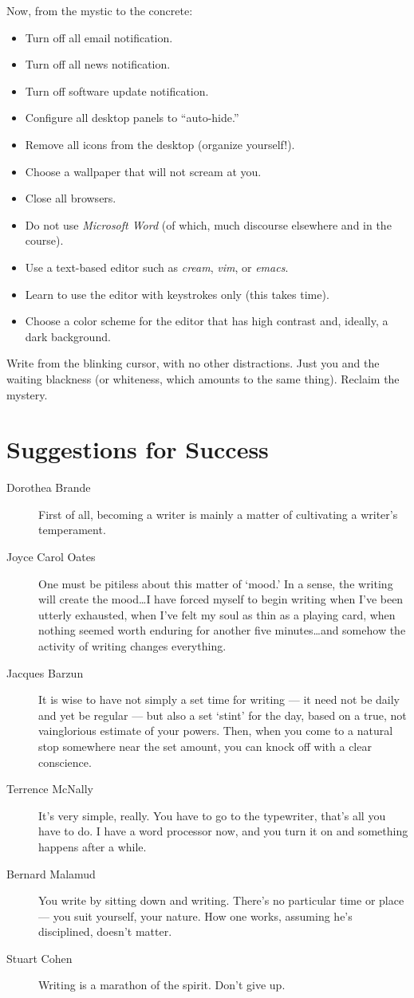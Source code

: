 \documentclass[letterpaper,oneside]{memoir}
\begin{document}
Now, from the mystic to the concrete:

\begin{itemize}
\item Turn off all email notification.
\item Turn off all news notification.
\item Turn off software update notification.
\item Configure all desktop panels to ``auto-hide.''
\item Remove all icons from the desktop (organize yourself!).
\item Choose a wallpaper that will not scream at you.
\item Close all browsers.
\item Do not use \textit{Microsoft Word} (of which, much discourse elsewhere and in the course).
\item Use a text-based editor such as \textit{cream}, \textit{vim}, or   \textit{emacs}.
\item Learn to use the editor with keystrokes only (this takes time).
\item Choose a color scheme for the editor that has high contrast and, ideally, a dark background.
\end{itemize}
Write from the blinking cursor, with no other distractions. Just you and the waiting blackness (or whiteness, which amounts to the same thing). Reclaim the mystery.
\newpage
\section{Suggestions for Success}
\begin{description}
\item [Dorothea Brande] First of all, becoming a writer is mainly a matter of cultivating a writer's temperament.
\item [Joyce Carol Oates] One must be pitiless about this matter of `mood.' In a sense, the writing will create the mood\ldots I have forced myself to begin writing when I've been utterly exhausted, when I've felt my soul as thin as a playing card, when nothing seemed worth enduring for another five minutes\ldots and somehow the activity of writing changes everything.
\item [Jacques Barzun] It is wise to have not simply a set time for writing --- it need not be daily and yet be regular --- but also a set `stint' for the day, based on a true, not vainglorious estimate of your powers. Then, when you come to a natural stop somewhere near the set amount, you can knock off with a clear conscience.
\item [Terrence McNally] It's very simple, really. You have to go to the typewriter, that's all you have to do. I have a word processor now, and you turn it on and something happens after a while.
\item [Bernard Malamud] You write by sitting down and writing. There's no particular time or place --- you suit yourself, your nature. How one works, assuming he's disciplined, doesn't matter.
\item [Stuart Cohen] Writing is a marathon of the spirit. Don't give up.
\end{description}
\end{document}
